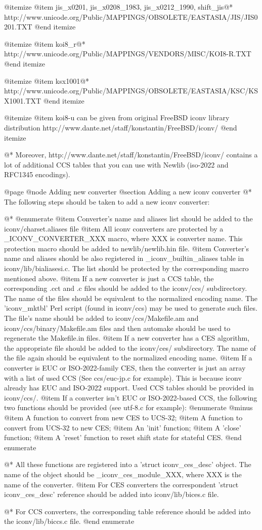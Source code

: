 @itemize
@item
jis_x0201, jis_x0208_1983, jis_x0212_1990, shift_jis@*
http://www.unicode.org/Public/MAPPINGS/OBSOLETE/EASTASIA/JIS/JIS0201.TXT
@end itemize

@itemize
@item
koi8_r@*
http://www.unicode.org/Public/MAPPINGS/VENDORS/MISC/KOI8-R.TXT
@end itemize

@itemize
@item
ksx1001@*
http://www.unicode.org/Public/MAPPINGS/OBSOLETE/EASTASIA/KSC/KSX1001.TXT
@end itemize

@itemize
@item
koi8-u can be given from original FreeBSD iconv library distribution
http://www.dante.net/staff/konstantin/FreeBSD/iconv/
@end itemize

@*
Moreover, http://www.dante.net/staff/konstantin/FreeBSD/iconv/ contains a 
lot of additional CCS tables that you can use with Newlib (iso-2022 and
RFC1345 encodings).

@page
@node Adding new converter
@section Adding a new iconv converter
@*
The following steps should be taken to add a new iconv converter:
 
@*
@enumerate
@item
Converter's name and aliases list should be added to 
the iconv/charset.aliases file
@item
All iconv converters are protected by a _ICONV_CONVERTER_XXX
macro, where XXX is converter name.  This protection macro should be added to
newlib/newlib.hin file.
@item
Converter's name and aliases should be also registered in _iconv_builtin_aliases
table in iconv/lib/bialiasesi.c.  The list should be protected by
the corresponding macro mentioned above.
@item
If a new converter is just a CCS table, the corresponding .cct and .c files
should be added to the iconv/ccs/ subdirectory. The name of the files 
should be equivalent to the normalized encoding name.  The 'iconv_mktbl' 
Perl script (found in iconv/ccs) may
be used to generate such files.  The file's name should be added to
iconv/ccs/Makefile.am and iconv/ccs/binary/Makefile.am files and then
automake should be used to regenerate the Makefile.in files.
@item
If a new converter has a CES algorithm, the appropriate file should be 
added to the
iconv/ces/ subdirectory.  The name of the file again should be equivalent 
to the normalized
encoding name.
@item
If a converter is EUC or ISO-2022-family CES, then the converter
is just an array with a list of used CCS (See ccs/euc-jp.c for example). This
is because iconv already has EUC and ISO-2022 support.  Used CCS tables should
be provided in iconv/ccs/.
@item
If a converter isn't EUC or ISO-2022-based CCS, the following two functions
should be provided (see utf-8.c for example):
@enumerate @minus
@item A function to convert from new CES to UCS-32;
@item A function to convert from UCS-32 to new CES;
@item An 'init' function;
@item A 'close' function;
@item A 'reset' function to reset shift state for stateful CES.
@end enumerate

@*
All these functions are registered into a 'struct iconv_ces_desc' object.
The name of the object should be _iconv_ces_module_XXX, where XXX is the
name of the converter.
@item
For CES converters the correspondent 'struct iconv_ces_desc' reference should
be added into iconv/lib/bices.c file.

@*
For CCS converters, the corresponding table reference should be added into
the iconv/lib/biccs.c file.
@end enumerate

